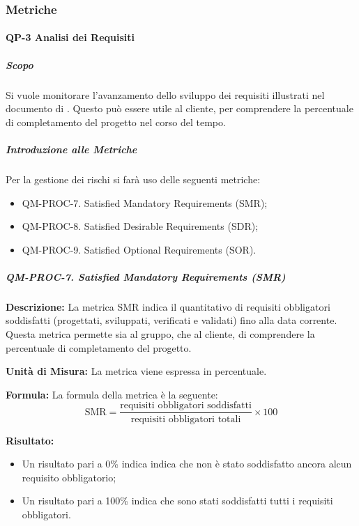		\subsubsection{Metriche}
			\paragraph{QP-3 Analisi dei Requisiti}

			\subparagraph{Scopo}
				Si vuole monitorare l'avanzamento dello sviluppo dei requisiti illustrati nel documento di . Questo può essere utile al cliente, per comprendere la percentuale di completamento del progetto nel corso del tempo.

			\subparagraph{Introduzione alle Metriche}

			Per la gestione dei rischi si farà uso delle seguenti metriche:

			\begin{itemize}
				\item QM-PROC-7. Satisfied Mandatory Requirements (SMR);
				\item QM-PROC-8. Satisfied Desirable Requirements (SDR);
				\item QM-PROC-9. Satisfied Optional Requirements (SOR).
			\end{itemize}

			\subparagraph{QM-PROC-7. Satisfied Mandatory Requirements (SMR)}

				\textbf{Descrizione: }
				La metrica SMR indica il quantitativo di requisiti obbligatori soddisfatti (progettati, sviluppati, verificati e validati) fino alla data corrente. Questa metrica permette sia al gruppo, che al cliente, di comprendere la percentuale di completamento del progetto.

				\textbf{Unità di Misura: }
				La metrica viene espressa in percentuale.

				\textbf{Formula: }
				La formula della metrica è la seguente:
				\[
					\text{SMR} = \frac{\text{requisiti obbligatori soddisfatti}}{\text{requisiti obbligatori totali}} \times 100
				\]

				\textbf{Risultato: }
				\begin{itemize}
					\item Un risultato pari a 0\% indica indica che non è stato soddisfatto ancora alcun requisito obbligatorio;
					\item Un risultato pari a 100\% indica che sono stati soddisfatti tutti i requisiti obbligatori.
				\end{itemize}

